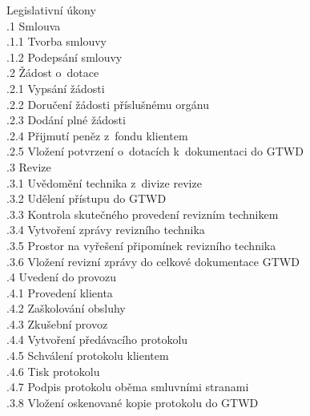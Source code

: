 \documentclass[a4paper, twoside, 11pt]{article}
\begin{document}
	 Legislativní úkony\\
		\indent {}.1 Smlouva\\
			\indent \indent {}.1.1 Tvorba smlouvy\\
			\indent \indent {}.1.2 Podepsání smlouvy\\
		\indent {}.2 Žádost o~dotace\\
			\indent \indent {}.2.1 Vypsání žádosti\\
			\indent \indent {}.2.2 Doručení žádosti příslušnému orgánu\\
			\indent \indent {}.2.3 Dodání plné žádosti\\
			\indent \indent {}.2.4 Přijmutí peněz z~fondu klientem\\
			\indent \indent {}.2.5 Vložení potvrzení o~dotacích k~dokumentaci do GTWD\\
		\indent {}.3 Revize\\
			\indent \indent {}.3.1 Uvědomění technika z~divize revize\\
			\indent \indent {}.3.2 Udělení přístupu do GTWD\\
			\indent \indent {}.3.3 Kontrola skutečného provedení revizním technikem\\
			\indent \indent {}.3.4 Vytvoření zprávy revizního technika\\
			\indent \indent {}.3.5 Prostor na vyřešení připomínek revizního technika\\
			\indent \indent {}.3.6 Vložení revizní zprávy do celkové dokumentace GTWD\\

		\indent {}.4 Uvedení do provozu\\
			\indent \indent {}.4.1 Provedení klienta\\
			\indent \indent {}.4.2 Zaškolování obsluhy\\
			\indent \indent {}.4.3 Zkušební provoz\\
			\indent \indent {}.4.4 Vytvoření předávacího protokolu\\
			\indent \indent {}.4.5 Schválení protokolu klientem\\
			\indent \indent {}.4.6 Tisk protokolu\\
			\indent \indent {}.4.7 Podpis protokolu oběma smluvními stranami\\
			\indent \indent {}.3.8 Vložení oskenované kopie protokolu do GTWD\\
		
\end{document}
